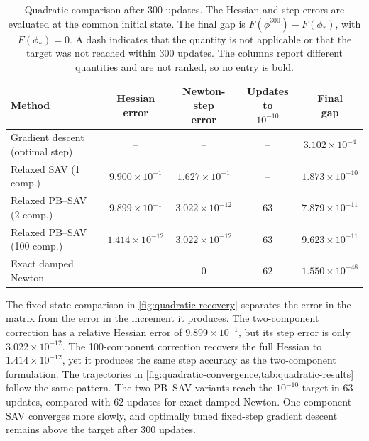 \begin{table}[t]
\centering
\caption{Quadratic comparison after 300 updates.  The Hessian and step errors
are evaluated at the common initial state.  The final gap is
\(F(\phi^{300})-F(\phi_*)\), with \(F(\phi_*)=0\).  A dash indicates
that the quantity is not applicable or that the target was not reached within
300 updates.  The columns report different quantities and are not ranked, so no
entry is bold.}
\label{tab:quadratic-results}
\footnotesize
\setlength{\tabcolsep}{2pt}
\begin{tabular}{@{}lcccc@{}}
\toprule
Method & \shortstack{Hessian\\error} & \shortstack{Newton-step\\error} &
\shortstack{Updates to\\\(10^{-10}\)} & \shortstack{Final\\gap} \\
\midrule
Gradient descent (optimal step) & -- & -- & -- & \(3.102\times10^{-4}\) \\
Relaxed SAV (1 comp.) & \(9.900\times10^{-1}\) & \(1.627\times10^{-1}\) & -- & \(1.873\times10^{-10}\) \\
Relaxed PB--SAV (2 comp.) & \(9.899\times10^{-1}\) & \(3.022\times10^{-12}\) & 63 & \(7.879\times10^{-11}\) \\
Relaxed PB--SAV (100 comp.) & \(1.414\times10^{-12}\) & \(3.022\times10^{-12}\) & 63 & \(9.623\times10^{-11}\) \\
Exact damped Newton & -- & 0 & 62 & \(1.550\times10^{-48}\) \\
\bottomrule
\end{tabular}
\end{table}

The fixed-state comparison in \cref{fig:quadratic-recovery} separates the
error in the matrix from the error in the increment it produces.  The
two-component correction has a relative Hessian error of
\(9.899\times10^{-1}\), but its step error is only \(3.022\times10^{-12}\).  The 100-component correction
recovers the full Hessian to \(1.414\times10^{-12}\), yet it produces the same
step accuracy as the two-component formulation.  The trajectories in
\cref{fig:quadratic-convergence,tab:quadratic-results} follow the same
pattern.  The two PB--SAV variants reach the \(10^{-10}\) target in 63
updates, compared with 62 updates for exact damped Newton.  One-component SAV
converges more slowly, and optimally tuned fixed-step gradient descent remains
above the target after 300 updates.

